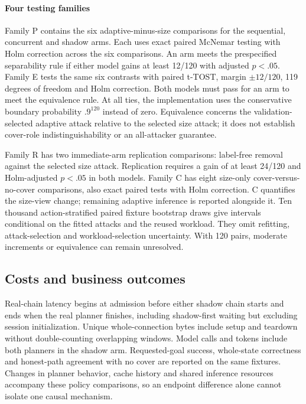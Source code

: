 \paragraph{Four testing families}
Family P contains the six adaptive-minus-size comparisons for the sequential, concurrent and shadow arms. Each uses exact paired McNemar testing with Holm correction across the six comparisons. An arm meets the prespecified separability rule if either model gains at least 12/120 with adjusted $p<.05$. Family E tests the same six contrasts with paired t-TOST, margin $\pm12/120$, 119 degrees of freedom and Holm correction. Both models must pass for an arm to meet the equivalence rule. At all ties, the implementation uses the conservative boundary probability $.9^{120}$ instead of zero. Equivalence concerns the validation-selected adaptive attack relative to the selected size attack; it does not establish cover-role indistinguishability or an all-attacker guarantee.

Family R has two immediate-arm replication comparisons: label-free removal against the selected size attack. Replication requires a gain of at least 24/120 and Holm-adjusted $p<.05$ in both models. Family C has eight size-only cover-versus-no-cover comparisons, also exact paired tests with Holm correction. C quantifies the size-view change; remaining adaptive inference is reported alongside it. Ten thousand action-stratified paired fixture bootstrap draws give intervals conditional on the fitted attacks and the reused workload. They omit refitting, attack-selection and workload-selection uncertainty. With 120 pairs, moderate increments or equivalence can remain unresolved.

\subsection{Costs and business outcomes}
Real-chain latency begins at admission before either shadow chain starts and ends when the real planner finishes, including shadow-first waiting but excluding session initialization. Unique whole-connection bytes include setup and teardown without double-counting overlapping windows. Model calls and tokens include both planners in the shadow arm. Requested-goal success, whole-state correctness and honest-path agreement with no cover are reported on the same fixtures. Changes in planner behavior, cache history and shared inference resources accompany these policy comparisons, so an endpoint difference alone cannot isolate one causal mechanism.

